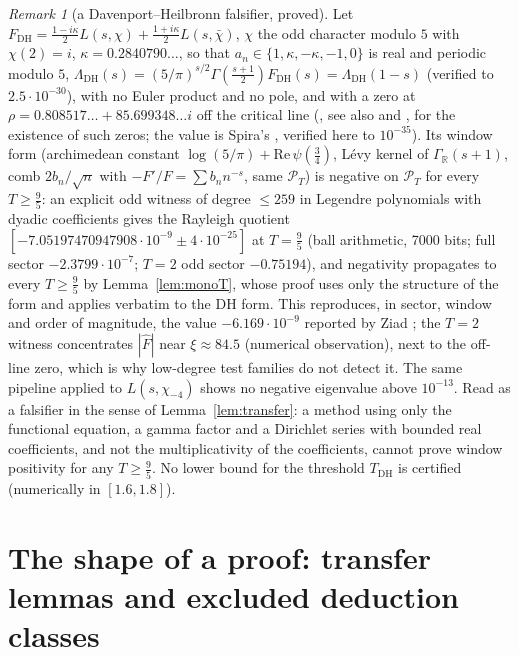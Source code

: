 \documentclass[11pt]{amsart}
\theoremstyle{definition}
\theoremstyle{remark}
\newtheorem{remark}[theorem]{Remark}
\newcommand{\R}{\mathbb R}
\newcommand{\PT}{\mathcal P_T}
\begin{document}
\begin{remark}[a Davenport--Heilbronn falsifier, proved]\label{rem:FDH}
Let $F_{\mathrm{DH}}=\tfrac{1-i\kappa}2L(s,\chi)+\tfrac{1+i\kappa}2L(s,\bar\chi)$, $\chi$ the odd character modulo $5$ with
$\chi(2)=i$, $\kappa=0.2840790\ldots$, so that $a_n\in\{1,\kappa,-\kappa,-1,0\}$ is real and periodic modulo $5$,
$\Lambda_{\mathrm{DH}}(s)=(5/\pi)^{s/2}\Gamma(\tfrac{s+1}2)F_{\mathrm{DH}}(s)=\Lambda_{\mathrm{DH}}(1-s)$ (verified to
$2.5\cdot10^{-30}$), with no Euler product and no pole, and with a zero at $\rho=0.808517\ldots+85.699348\ldots i$ off the critical line
(\cite{DavenportHeilbronn1936}, see also \cite[\S10.25]{Titchmarsh1986} and \cite[\S11.4]{Eberwein2026}, for the existence of such zeros; the value is Spira's \cite{Spira1994}, verified here to $10^{-35}$). Its window form (archimedean constant $\log(5/\pi)+\mathrm{Re}\,\psi(\tfrac34)$, L\'evy kernel of
$\Gamma_\R(s+1)$, comb $2b_n/\sqrt n$ with $-F'/F=\sum b_nn^{-s}$, same $\PT$) is negative on $\PT$ for every
$T\ge\frac95$: an explicit odd witness of degree $\le259$ in Legendre polynomials with dyadic coefficients gives the Rayleigh
quotient $[-7.05197470947908\cdot10^{-9}\pm4\cdot10^{-25}]$ at $T=\frac95$ (ball arithmetic, 7000 bits; full sector
$-2.3799\cdot10^{-7}$; $T=2$ odd sector $-0.75194$), and negativity propagates to every $T\ge\frac95$ by Lemma~\ref{lem:monoT}, whose proof uses only the structure of the form and applies verbatim to the DH form. This reproduces, in sector,
window and order of magnitude, the value $-6.169\cdot10^{-9}$ reported by Ziad \cite{ZiadDH}; the $T=2$ witness concentrates $|\hat F|$
near $\xi\approx84.5$ (numerical observation), next to the off-line zero, which is why low-degree test families do not detect it. The same pipeline applied to
$L(s,\chi_{-4})$ shows no negative eigenvalue above $10^{-13}$. Read as a falsifier in the sense of Lemma~\ref{lem:transfer}: a
method using only the functional equation, a gamma factor and a Dirichlet series with bounded real coefficients, and not the
multiplicativity of the coefficients, cannot prove window positivity for any $T\ge\frac95$. No lower bound for the threshold $T_{\mathrm{DH}}$ is certified (numerically in $[1.6,1.8]$).
\end{remark}

\section{The shape of a proof: transfer lemmas and excluded deduction classes}\label{sec:shape}
\end{document}

